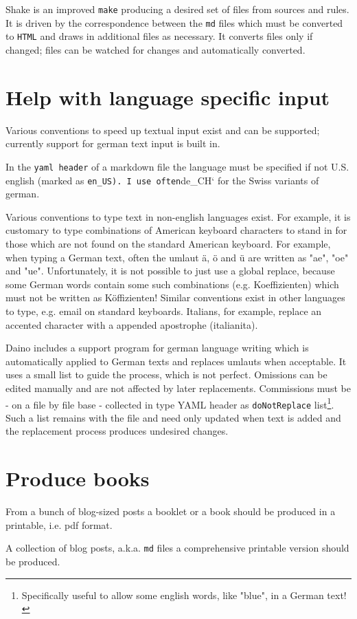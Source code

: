 \documentclass{tufte-book}
\begin{document}
Shake is an improved \texttt{make} producing a desired set of files from
sources and rules. It is driven by the correspondence between the
\texttt{md} files which must be converted to \texttt{HTML} and draws in
additional files as necessary. It converts files only if changed; files
can be watched for changes and automatically converted.

\chapter{Help with language specific input}
\begin{mdframed}Various conventions to speed up textual input exist and can be supported; currently support for german text input is built in.\end{mdframed}
In the \texttt{yaml\ header} of a markdown file the language must be
specified if not U.S. english (marked as
\texttt{en\_US).\ I\ use\ often}de\_CH` for the Swiss variants of
german.

Various conventions to type text in non-english languages exist. For
example, it is customary to type combinations of American keyboard
characters to stand in for those which are not found on the standard
American keyboard. For example, when typing a German text, often the
umlaut ä, ö and ü are written as "ae", "oe" and "ue". Unfortunately, it
is not possible to just use a global replace, because some German words
contain some such combinations (e.g. Koeffizienten) which must not be
written as Köffizienten! Similar conventions exist in other languages to
type, e.g. email on standard keyboards. Italians, for example, replace
an accented character with a appended apostrophe
(italianita\textquotesingle).

Daino includes a support program for german language writing which is
automatically applied to German texts and replaces umlauts when
acceptable. It uses a small list to guide the process, which is not
perfect. Omissions can be edited manually and are not affected by later
replacements. Commissions must be - on a file by file base - collected
in type YAML header as \texttt{doNotReplace} list\footnote{Specifically
	useful to allow some english words, like "blue", in a German text!}.
Such a list remains with the file and need only updated when text is
added and the replacement process produces undesired changes.

\chapter{Produce books}
\begin{mdframed}From a bunch of blog-sized posts a booklet or a book should be produced in a printable, i.e. pdf format.\end{mdframed}
A collection of blog posts, a.k.a. \texttt{md} files a comprehensive
printable version should be produced.
\end{document}

